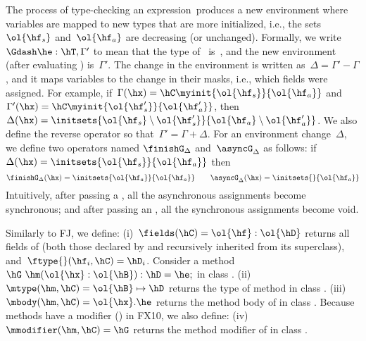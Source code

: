 The process of type-checking an expression~\he produces a new environment
    where variables are mapped to new types that are more initialized,
    i.e., the sets~$\ol{\hf_s}$ and~$\ol{\hf_a}$ are decreasing (or unchanged).
Formally, we write~$\Gdash \he : \hT, \Gamma'$ to mean that the type of~\he
    is~\hT, and the new environment (after evaluating \he) is~$\Gamma'$.
The change in the environment is written as~$\Delta = \Gamma' - \Gamma$,
    and it maps variables to the change in their masks,
    i.e., which fields were assigned.
For example, if~$\Gamma(\hx)=\hC\myinit{\ol{\hf_s}}{\ol{\hf_a}}$
    and~$\Gamma'(\hx)=\hC\myinit{\ol{\hf'_s}}{\ol{\hf'_a}}$,
    then~$\Delta(\hx)=\initsets{\ol{\hf_s} \setminus \ol{\hf'_s}}{\ol{\hf_a} \setminus \ol{\hf'_a}}$.
We also define the reverse operator so that~$\Gamma' = \Gamma + \Delta$.
For an environment change~$\Delta$, we define two operators named
    $\finishG_\Delta$ and~$\asyncG_\Delta$ as follows:
    if~$\Delta(\hx)=\initsets{\ol{\hf_s}}{\ol{\hf_a}}$ then
\[
    \finishG_\Delta(\hx) = \initsets{\ol{\hf_a}}{\ol{\hf_a}} \qquad
    \asyncG_\Delta(\hx) = \initsets{}{\ol{\hf_a}}
\]
Intuitively, after passing a \finish, all the asynchronous assignments become synchronous;
    and after passing an \async, all the synchronous assignments become void.

Similarly to FJ, we define:
(i)~$\fields(\hC)=\ol{\hf}:\ol{\hD}$ returns all fields of \hC (both those declared by \hC and recursively inherited from its superclass),
    and~$\ftype{}(\hf_i,\hC) =\hD_i$.
Consider a method~$\hG ~ \hm(\ol{\hx}:\ol{\hB}):\hD=\he;$ in class \hC.
(ii)~$\mtype(\hm,\hC) = \ol{\hB}\mapsto\hD$ returns the type of method \hm in class \hC.
(iii)~$\mbody(\hm,\hC) = \ol{\hx}.\he$ returns the method body of \hm in class \hC.
Because methods have a modifier (\hG) in FX10, we also define:
(iv)~$\mmodifier(\hm,\hC) = \hG$ returns the method modifier of \hm in class \hC.



